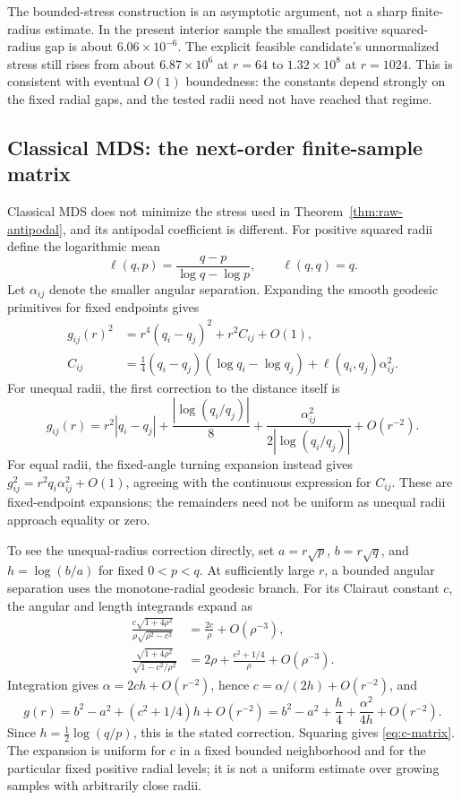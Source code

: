 \documentclass[11pt]{article}
\theoremstyle{remark}\newtheorem{remark}[proposition]{Remark}
\begin{document}
The bounded-stress construction is an asymptotic argument, not a sharp
finite-radius estimate. In the present interior sample the smallest positive
squared-radius gap is about $6.06\times10^{-6}$. The explicit feasible
candidate's unnormalized stress still rises from about $6.87\times10^6$ at
$r=64$ to $1.32\times10^8$ at $r=1024$. This is consistent with eventual
$O(1)$ boundedness: the constants depend strongly on the fixed radial gaps,
and the tested radii need not have reached that regime.

\subsection{Classical MDS: the next-order finite-sample matrix}
Classical MDS does not minimize the stress used in Theorem~\ref{thm:raw-antipodal},
and its antipodal coefficient is different. For positive squared radii define
the logarithmic mean
\begin{equation}\label{eq:logmean}
 \ell(q,p)=\frac{q-p}{\log q-\log p},\qquad \ell(q,q)=q.
\end{equation}
Let $\alpha_{ij}$ denote the smaller angular separation. Expanding the smooth
geodesic primitives for fixed endpoints gives
\begin{align}
 g_{ij}(r)^2&=r^4(q_i-q_j)^2+r^2C_{ij}+O(1),\label{eq:second-order}\\
 C_{ij}&=\tfrac14(q_i-q_j)(\log q_i-\log q_j)
          +\ell(q_i,q_j)\alpha_{ij}^2.\label{eq:c-matrix}
\end{align}
For unequal radii, the first correction to the distance itself is
\begin{equation}
 g_{ij}(r)=r^2|q_i-q_j|
 +\frac{|\log(q_i/q_j)|}{8}
 +\frac{\alpha_{ij}^2}{2|\log(q_i/q_j)|}+O(r^{-2}).
\end{equation}
For equal radii, the fixed-angle turning expansion instead gives
$g_{ij}^2=r^2q_i\alpha_{ij}^2+O(1)$, agreeing with the continuous expression
for $C_{ij}$. These are fixed-endpoint expansions; the remainders need not be
uniform as unequal radii approach equality or zero.

To see the unequal-radius correction directly, set $a=r\sqrt p$,
$b=r\sqrt q$, and $h=\log(b/a)$ for fixed $0<p<q$. At sufficiently large
$r$, a bounded angular separation uses the monotone-radial geodesic branch.
For its Clairaut constant $c$, the angular and length integrands expand as
\begin{align}
 \frac{c\sqrt{1+4\rho^2}}{\rho\sqrt{\rho^2-c^2}}
 &=\frac{2c}{\rho}+O(\rho^{-3}),\\
 \frac{\sqrt{1+4\rho^2}}{\sqrt{1-c^2/\rho^2}}
 &=2\rho+\frac{c^2+1/4}{\rho}+O(\rho^{-3}).
\end{align}
Integration gives $\alpha=2ch+O(r^{-2})$, hence
$c=\alpha/(2h)+O(r^{-2})$, and
\begin{equation}
 g(r)=b^2-a^2+(c^2+1/4)h+O(r^{-2})
     =b^2-a^2+\frac h4+\frac{\alpha^2}{4h}+O(r^{-2}).
\end{equation}
Since $h=\tfrac12\log(q/p)$, this is the stated correction. Squaring gives
\eqref{eq:c-matrix}. The expansion is uniform for $c$ in a fixed bounded
neighborhood and for the particular fixed positive radial levels; it is not
a uniform estimate over growing samples with arbitrarily close radii.
\end{document}

